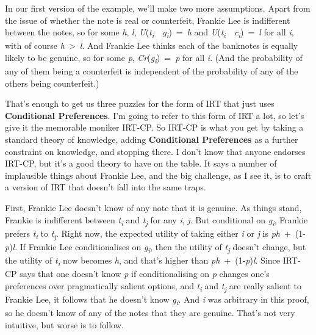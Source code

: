 \documentclass[
  11pt,
]{book}
\begin{document}
In our first version of the example, we'll make two more assumptions. Apart from the issue of whether the note is real or counterfeit, Frankie Lee is indifferent between the notes, so for some \emph{h}, \emph{l}, \emph{U}(\emph{t\textsubscript{i}}~\textbar~\emph{g\textsubscript{i}})~=~\emph{h} and \emph{U}(\emph{t\textsubscript{i}}~\textbar~\emph{c\textsubscript{i}})~=~\emph{l} for all \emph{i}, with of course \emph{h}~\textgreater~\emph{l}. And Frankie Lee thinks each of the banknotes is equally likely to be genuine, so for some \emph{p}, \emph{Cr}(\emph{g\textsubscript{i}})~=~\emph{p} for all \emph{i}. (And the probability of any of them being a counterfeit is independent of the probability of any of the others being counterfeit.)

That's enough to get us three puzzles for the form of IRT that just uses \textbf{Conditional Preferences}. I'm going to refer to this form of IRT a lot, so let's give it the memorable moniker IRT-CP. So IRT-CP is what you get by taking a standard theory of knowledge, adding \textbf{Conditional Preferences} as a further constraint on knowledge, and stopping there. I don't know that anyone endorses IRT-CP, but it's a good theory to have on the table. It says a number of implausible things about Frankie Lee, and the big challenge, as I see it, is to craft a version of IRT that doesn't fall into the same traps.

First, Frankie Lee doesn't know of any note that it is genuine. As things stand, Frankie is indifferent between \emph{t\textsubscript{i}} and \emph{t\textsubscript{j}} for any \emph{i}, \emph{j}. But conditional on \emph{g\textsubscript{i}}, Frankie prefers \emph{t\textsubscript{i}} to \emph{t\textsubscript{j}}. Right now, the expected utility of taking either \emph{i} or \emph{j} is \emph{ph}~+~(1-\emph{p})\emph{l}. If Frankie Lee conditionalises on \emph{g\textsubscript{i}}, then the utility of \emph{t\textsubscript{j}} doesn't change, but the utility of \emph{t\textsubscript{i}} now becomes \emph{h}, and that's higher than \emph{ph}~+~(1-\emph{p})\emph{l}. Since IRT-CP says that one doesn't know \emph{p} if conditionalising on \emph{p} changes one's preferences over pragmatically salient options, and \emph{t\textsubscript{i}} and \emph{t\textsubscript{j}} are really salient to Frankie Lee, it follows that he doesn't know \emph{g\textsubscript{i}}. And \emph{i} was arbitrary in this proof, so he doesn't know of any of the notes that they are genuine. That's not very intuitive, but worse is to follow.
\end{document}
